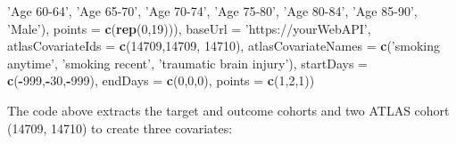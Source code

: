 \documentclass[
]{article}
\newenvironment{Shaded}{\begin{snugshade}}{\end{snugshade}}
\newcommand{\DataTypeTok}[1]{\textcolor[rgb]{0.13,0.29,0.53}{#1}}
\newcommand{\DecValTok}[1]{\textcolor[rgb]{0.00,0.00,0.81}{#1}}
\newcommand{\KeywordTok}[1]{\textcolor[rgb]{0.13,0.29,0.53}{\textbf{#1}}}
\newcommand{\NormalTok}[1]{#1}
\newcommand{\OperatorTok}[1]{\textcolor[rgb]{0.81,0.36,0.00}{\textbf{#1}}}
\newcommand{\StringTok}[1]{\textcolor[rgb]{0.31,0.60,0.02}{#1}}
\begin{document}
\begin{Shaded}
\begin{Highlighting}[]
                                                                  \StringTok{'Age 60-64'}\NormalTok{, }\StringTok{'Age 65-70'}\NormalTok{,}
                                                                  \StringTok{'Age 70-74'}\NormalTok{, }\StringTok{'Age 75-80'}\NormalTok{,}
                                                                  \StringTok{'Age 80-84'}\NormalTok{, }\StringTok{'Age 85-90'}\NormalTok{,}
                                                                  \StringTok{'Male'}\NormalTok{), }
                                                \DataTypeTok{points =} \KeywordTok{c}\NormalTok{(}\KeywordTok{rep}\NormalTok{(}\DecValTok{0}\NormalTok{,}\DecValTok{19}\NormalTok{))),}
                \DataTypeTok{baseUrl =} \StringTok{'https://yourWebAPI'}\NormalTok{,}
                \DataTypeTok{atlasCovariateIds =} \KeywordTok{c}\NormalTok{(}\DecValTok{14709}\NormalTok{,}\DecValTok{14709}\NormalTok{, }\DecValTok{14710}\NormalTok{),}
                \DataTypeTok{atlasCovariateNames =} \KeywordTok{c}\NormalTok{(}\StringTok{'smoking anytime'}\NormalTok{, }\StringTok{'smoking recent'}\NormalTok{, }\StringTok{'traumatic brain injury'}\NormalTok{),}
                \DataTypeTok{startDays =} \KeywordTok{c}\NormalTok{(}\OperatorTok{-}\DecValTok{999}\NormalTok{,}\OperatorTok{-}\DecValTok{30}\NormalTok{,}\OperatorTok{-}\DecValTok{999}\NormalTok{),}
                \DataTypeTok{endDays =}  \KeywordTok{c}\NormalTok{(}\DecValTok{0}\NormalTok{,}\DecValTok{0}\NormalTok{,}\DecValTok{0}\NormalTok{),}
                \DataTypeTok{points =} \KeywordTok{c}\NormalTok{(}\DecValTok{1}\NormalTok{,}\DecValTok{2}\NormalTok{,}\DecValTok{1}\NormalTok{))}
\end{Highlighting}
\end{Shaded}

The code above extracts the target and outcome cohorts and two ATLAS
cohort (14709, 14710) to create three covariates:
\end{document}
